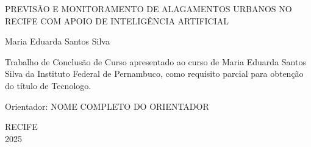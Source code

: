 \begin{folhaderosto}
    \center
    \vspace*{2cm}
    
    {\ABNTEXchapterfont\LARGE PREVISÃO E MONITORAMENTO DE ALAGAMENTOS URBANOS NO RECIFE COM APOIO DE INTELIGÊNCIA ARTIFICIAL}
    
    \vspace{4cm}
    
    {\large Maria Eduarda Santos Silva}
    
    \vfill
    
    \begin{flushright}
        \begin{minipage}{8cm}
            \begin{SingleSpace}
                Trabalho de Conclusão de Curso apresentado ao curso de Maria Eduarda Santos Silva da Instituto Federal de Pernambuco, como requisito parcial para obtenção do título de Tecnologo.
                
                \vspace{1cm}
                
                Orientador: NOME COMPLETO DO ORIENTADOR
            \end{SingleSpace}
        \end{minipage}
    \end{flushright}
    
    \vspace{2cm}
    
    {\large RECIFE \\ 2025}
\end{folhaderosto}